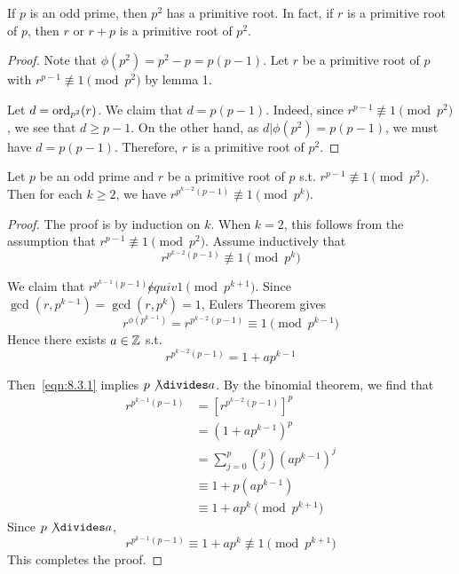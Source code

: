 \begin{corollary}
    If $p$ is an odd prime, then $p^2$ has a primitive root.
    In fact, if $r$ is a primitive root of $p$, then $r$ or 
    $r + p$ is a primitive root of $p^2$.
\end{corollary}
\begin{proof}
    Note that $\phi(p^2) = p^2 - p = p(p-1)$.
    Let $r$ be a primitive root of $p$ with $r^{p-1} \not\equiv 1 \pmod {p^2}$ by lemma 1.

    Let $d = \text{ord}_{p^2}(r)$. 
    We claim that $d = p(p-1)$.
    Indeed, since $r^{p-1} \not \equiv 1 \pmod {p^2}$, we see that $d \geq p-1$.
    On the other hand, as $d | \phi(p^2) = p(p-1)$, we must have $d = p(p-1)$.
    Therefore, $r$ is a primitive root of $p^2$.
\end{proof}

\begin{lemma}
    Let $p$ be an odd prime and $r$ be a primitive root of $p$ s.t. $r^{p-1} \not\equiv 1 \pmod {p^2}$.
    Then for each $k \geq 2$, we have $r^{p^{k-2}(p-1)} \not\equiv 1 \pmod{p^k}$.
\end{lemma}
\begin{proof}
    The proof is by induction on $k$. When $k = 2$, this follows from the assumption that
    $r^{p-1} \not\equiv 1 \pmod {p^2}$.
    Assume inductively that 
    \[  
        \tag{*}
        r^{p^{k-2}(p-1)} \not\equiv 1 \pmod {p^k}
        \label{eqn:8.3.1}
    \]

    We claim that $r^{p^{k-1}(p-1)} \not equiv 1 \pmod {p^{k+1}}$.
    Since $\gcd(r, p^{k-1}) = \gcd(r, p^k) = 1$,
    Eulers Theorem gives
    \[
        r^{\phi(p^{k-1})} = r^{p^{k-2}(p-1)} \equiv 1 \pmod p^{k-1}
    \]
    Hence there exists $a \in \mathbb{Z}$ s.t.
    \[
        r^{p^{k-2}(p-1)} = 1 + ap^{k-1}
    \]

    Then~\eqref{eqn:8.3.1} implies $p \not \divides  a$. By the binomial theorem, we find that
    \[
        \begin{aligned}
            r^{p^{k-1}(p-1)} &= {[r^{p^{k-2}(p-1)}]}^p \\
            &= {(1 + ap^{k-1})}^p \\
            &= \sum_{j=0}^{p}{p \choose j}{(ap^{k-1})}^j \\
            &\equiv 1 + p (ap^{k-1}) \\
            &\equiv 1 + ap^k \pmod p^{k+1}
        \end{aligned}
    \]
    Since $p \not \divides  a$, 
    \[
        r^{p^{k-1}(p-1)} \equiv 1 + ap^k \not\equiv 1 \pmod p^{k+1}
    \]
    This completes the proof.
\end{proof}


